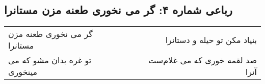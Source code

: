 \begin{center}
\section*{رباعی شماره ۴: گر می نخوری طعنه مزن مستانرا}
\label{sec:sh004}
\begin{longtable}{l p{0.5cm} r}
گر می نخوری طعنه مزن مستانرا
&&
بنیاد مکن تو حیله و دستانرا
\\
تو غره بدان مشو که می مینخوری
&&
صد لقمه خوری که می غلام‌ست آنرا
\\
\end{longtable}
\end{center}
